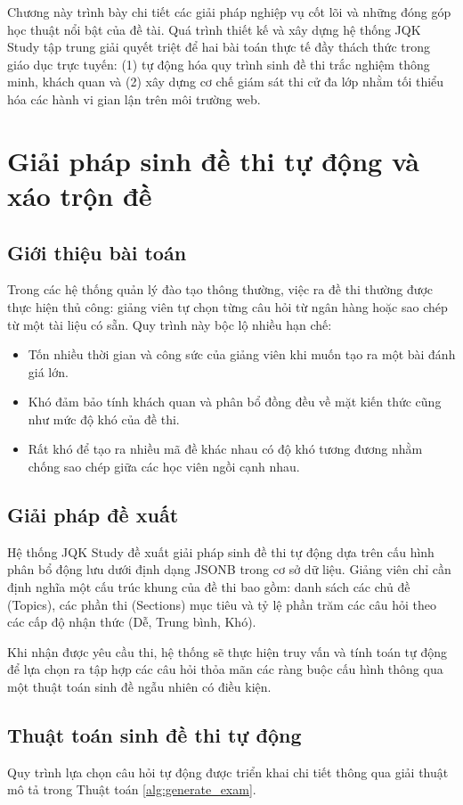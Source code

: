 \documentclass[../DoAn.tex]{subfiles}
\begin{document}
Chương này trình bày chi tiết các giải pháp nghiệp vụ cốt lõi và những đóng góp học thuật nổi bật của đề tài. Quá trình thiết kế và xây dựng hệ thống JQK Study tập trung giải quyết triệt để hai bài toán thực tế đầy thách thức trong giáo dục trực tuyến: (1) tự động hóa quy trình sinh đề thi trắc nghiệm thông minh, khách quan và (2) xây dựng cơ chế giám sát thi cử đa lớp nhằm tối thiểu hóa các hành vi gian lận trên môi trường web.

\section{Giải pháp sinh đề thi tự động và xáo trộn đề}
\label{section:5.1}

\subsection{Giới thiệu bài toán}
Trong các hệ thống quản lý đào tạo thông thường, việc ra đề thi thường được thực hiện thủ công: giảng viên tự chọn từng câu hỏi từ ngân hàng hoặc sao chép từ một tài liệu có sẵn. Quy trình này bộc lộ nhiều hạn chế:
\begin{itemize}
    \item Tốn nhiều thời gian và công sức của giảng viên khi muốn tạo ra một bài đánh giá lớn.
    \item Khó đảm bảo tính khách quan và phân bổ đồng đều về mặt kiến thức cũng như mức độ khó của đề thi.
    \item Rất khó để tạo ra nhiều mã đề khác nhau có độ khó tương đương nhằm chống sao chép giữa các học viên ngồi cạnh nhau.
\end{itemize}

\subsection{Giải pháp đề xuất}
Hệ thống JQK Study đề xuất giải pháp sinh đề thi tự động dựa trên cấu hình phân bổ động lưu dưới định dạng JSONB trong cơ sở dữ liệu. Giảng viên chỉ cần định nghĩa một cấu trúc khung của đề thi bao gồm: danh sách các chủ đề (Topics), các phần thi (Sections) mục tiêu và tỷ lệ phần trăm các câu hỏi theo các cấp độ nhận thức (Dễ, Trung bình, Khó).

Khi nhận được yêu cầu thi, hệ thống sẽ thực hiện truy vấn và tính toán tự động để lựa chọn ra tập hợp các câu hỏi thỏa mãn các ràng buộc cấu hình thông qua một thuật toán sinh đề ngẫu nhiên có điều kiện.

\subsection{Thuật toán sinh đề thi tự động}
Quy trình lựa chọn câu hỏi tự động được triển khai chi tiết thông qua giải thuật mô tả trong Thuật toán \ref{alg:generate_exam}.
\end{document}
